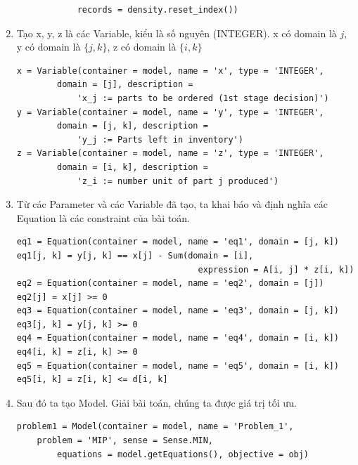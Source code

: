 \documentclass[a4paper]{article}
\begin{document}
\begin{enumerate}
\begin{tcolorbox}[colback=blue!5!white,colframe=blue!75!black]
\begin{verbatim}
            records = density.reset_index())
    \end{verbatim}
    \end{tcolorbox}
    \newpage
    \item[] {Tạo x, y, z là các Variable, kiểu là số nguyên (INTEGER). x có domain là $j$, y có domain là $\{j,k\}$, z có domain là $\{i,k\}$}
    \begin{tcolorbox}[colback=blue!5!white,colframe=blue!75!black]
    \begin{verbatim}
x = Variable(container = model, name = 'x', type = 'INTEGER', 
        domain = [j], description =
            'x_j := parts to be ordered (1st stage decision)')
y = Variable(container = model, name = 'y', type = 'INTEGER',
        domain = [j, k], description = 
            'y_j := Parts left in inventory')
z = Variable(container = model, name = 'z', type = 'INTEGER',
        domain = [i, k], description = 
            'z_i := number unit of part j produced')
    \end{verbatim}
    \end{tcolorbox}
    \item[] {Từ các Parameter và các Variable đã tạo, ta khai báo và định nghĩa các Equation là các constraint của bài toán.}
    \begin{tcolorbox}[colback=blue!5!white,colframe=blue!75!black]
    \begin{verbatim}
eq1 = Equation(container = model, name = 'eq1', domain = [j, k])
eq1[j, k] = y[j, k] == x[j] - Sum(domain = [i], 
                                    expression = A[i, j] * z[i, k])
eq2 = Equation(container = model, name = 'eq2', domain = [j])
eq2[j] = x[j] >= 0
eq3 = Equation(container = model, name = 'eq3', domain = [j, k])
eq3[j, k] = y[j, k] >= 0
eq4 = Equation(container = model, name = 'eq4', domain = [i, k])
eq4[i, k] = z[i, k] >= 0
eq5 = Equation(container = model, name = 'eq5', domain = [i, k])
eq5[i, k] = z[i, k] <= d[i, k]
    \end{verbatim}
    \end{tcolorbox}
    \item[] {Sau đó ta tạo Model. Giải bài toán, chúng ta được giá trị tối ưu.}
    \begin{tcolorbox}[colback=blue!5!white,colframe=blue!75!black]
    \begin{verbatim}
problem1 = Model(container = model, name = 'Problem_1', 
    problem = 'MIP', sense = Sense.MIN, 
        equations = model.getEquations(), objective = obj)
    \end{verbatim}
    \end{tcolorbox}
\end{enumerate}
\end{document}
